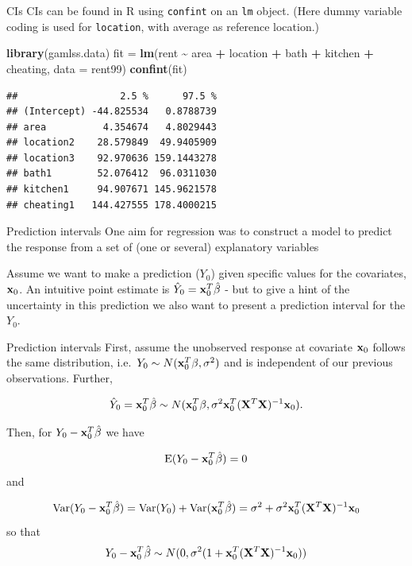 \documentclass[
  ignorenonframetext,
]{beamer}
\newenvironment{Shaded}{\begin{snugshade}}{\end{snugshade}}
\newcommand{\AttributeTok}[1]{\textcolor[rgb]{0.13,0.29,0.53}{#1}}
\newcommand{\FunctionTok}[1]{\textcolor[rgb]{0.13,0.29,0.53}{\textbf{#1}}}
\newcommand{\NormalTok}[1]{#1}
\newcommand{\OtherTok}[1]{\textcolor[rgb]{0.56,0.35,0.01}{#1}}
\newcommand{\SpecialCharTok}[1]{\textcolor[rgb]{0.81,0.36,0.00}{\textbf{#1}}}
\begin{document}
\begin{frame}[fragile]{CIs}
\label{cis}
CIs can be found in R using \texttt{confint} on an \texttt{lm} object.
(Here dummy variable coding is used for \texttt{location}, with average
as reference location.)

\begin{Shaded}
\begin{Highlighting}[]
\FunctionTok{library}\NormalTok{(gamlss.data)}
\NormalTok{fit }\OtherTok{=} \FunctionTok{lm}\NormalTok{(rent }\SpecialCharTok{\textasciitilde{}}\NormalTok{ area }\SpecialCharTok{+}\NormalTok{ location }\SpecialCharTok{+}\NormalTok{ bath }\SpecialCharTok{+}\NormalTok{ kitchen }\SpecialCharTok{+}\NormalTok{ cheating, }\AttributeTok{data =}\NormalTok{ rent99)}
\FunctionTok{confint}\NormalTok{(fit)}
\end{Highlighting}
\end{Shaded}

\begin{verbatim}
##                  2.5 %      97.5 %
## (Intercept) -44.825534   0.8788739
## area          4.354674   4.8029443
## location2    28.579849  49.9405909
## location3    92.970636 159.1443278
## bath1        52.076412  96.0311030
## kitchen1     94.907671 145.9621578
## cheating1   144.427555 178.4000215
\end{verbatim}
\end{frame}

\begin{frame}{Prediction intervals}
\label{prediction-intervals}
One aim for regression was to construct a model to predict the response
from a set of (one or several) explanatory variables

Assume we want to make a prediction (\(Y_0\)) given specific values for
the covariates, \({\bf x}_0\). An intuitive point estimate is
\(\hat{Y}_0={\bf x}_0^T \hat{\beta}\) - but to give a hint of the
uncertainty in this prediction we also want to present a prediction
interval for the \(Y_0\).
\end{frame}

\begin{frame}{Prediction intervals}
\label{prediction-intervals-1}
First, assume the unobserved response at covariate \({\bf x}_0\) follows
the same distribution, i.e.~\(Y_0 \sim N({\bf x}_0^T \beta,\sigma^2)\)
and is independent of our previous observations. Further,

\[\hat{Y}_0={\bf x}_0^T \hat{\beta} \sim N({\bf x}_0^T \beta,\sigma^2 {\bf x}_0^T({\bf X}^T{\bf X})^{-1}{\bf x}_0).\]

Then, for \(Y_0-{\bf x}_0^T \hat{\beta}\) we have

\[\text{E}(Y_0-{\bf x}_0^T \hat{\beta})=0\] and

\[\text{Var}(Y_0-{\bf x}_0^T \hat{\beta})=\text{Var}(Y_0)+\text{Var}({\bf x}_0^T \hat{\beta})=\sigma^2+\sigma^2{\bf x}_0^T({\bf X}^T{\bf X})^{-1}{\bf x}_0\]
so that
\[Y_0-{\bf x}_0^T \hat{\beta}\sim N(0,\sigma^2 (1+{\bf x}_0^T({\bf X}^T{\bf X})^{-1}{\bf x}_0)) \]
\end{frame}
\end{document}
